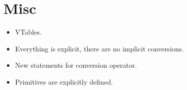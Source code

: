 \section{Misc}
\begin{itemize}
  \item VTables.
  \item Everything is explicit, there are no implicit conversions.
  \item New statements for conversion operator.
  \item Primitives are explicitly defined.
\end{itemize}
